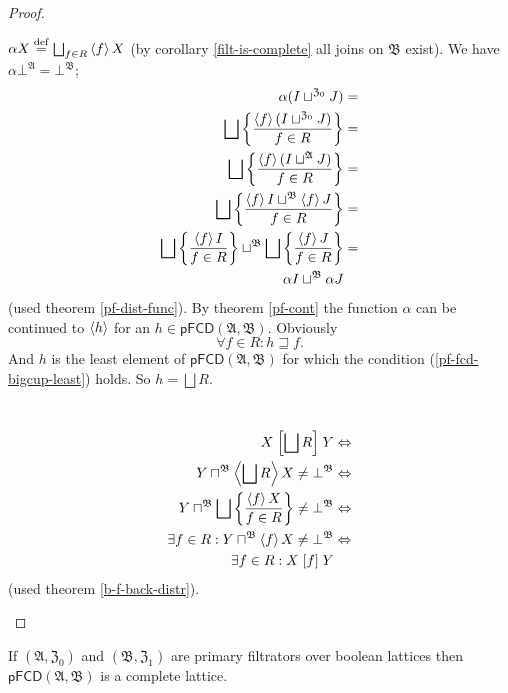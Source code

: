 \begin{proof}
~
\begin{widedisorder}
\item [{\ref{pf-join-f}}] $\alpha X\eqdef\bigsqcup_{f\in R}\supfun fX$
(by corollary \ref{filt-is-complete} all joins on $\mathfrak{B}$
exist). We have $\alpha\bot^{\mathfrak{A}}=\bot^{\mathfrak{B}}$;
\begin{align*}
\alpha(I\sqcup^{\mathfrak{Z}_{0}}J) & =\\
\bigsqcup\setcond{\supfun f(I\sqcup^{\mathfrak{Z}_{0}}J)}{f\in R} & =\\
\bigsqcup\setcond{\supfun f(I\sqcup^{\mathfrak{A}}J)}{f\in R} & =\\
\bigsqcup\setcond{\supfun fI\sqcup^{\mathfrak{B}}\supfun fJ}{f\in R} & =\\
\bigsqcup\setcond{\supfun fI}{f\in R}\sqcup^{\mathfrak{B}}\bigsqcup\setcond{\supfun fJ}{f\in R} & =\\
\alpha I\sqcup^{\mathfrak{B}}\alpha J
\end{align*}
(used theorem \ref{pf-dist-func}). By theorem \ref{pf-cont} the
function $\alpha$ can be continued to $\left\langle h\right\rangle$ for an $h\in\mathsf{pFCD}(\mathfrak{A},\mathfrak{B})$.
Obviously
\begin{equation}
\forall f\in R:h\sqsupseteq f.\label{pf-fcd-bigcup-least}
\end{equation}
And $h$ is the least element of $\mathsf{pFCD}(\mathfrak{A},\mathfrak{B})$
for which the condition (\ref{pf-fcd-bigcup-least}) holds. So $h=\bigsqcup R$.

\begin{widedisorder}
\item [{\ref{pf-join-r}}] ~
\begin{align*}
X\suprel{\bigsqcup R}Y & \Leftrightarrow\\
Y\sqcap^{\mathfrak{B}}\supfun{\bigsqcup R}X\ne\bot^{\mathfrak{B}} & \Leftrightarrow\\
Y\sqcap^{\mathfrak{B}}\bigsqcup\setcond{\supfun fX}{f\in R}\ne\bot^{\mathfrak{B}} & \Leftrightarrow\\
\exists f\in R:Y\sqcap^{\mathfrak{B}}\supfun fX\ne\bot^{\mathfrak{B}} & \Leftrightarrow\\
\exists f\in R:X\suprel fY
\end{align*}
(used theorem \ref{b-f-back-distr}).
\end{widedisorder}
\end{widedisorder}
\end{proof}
\begin{cor}
\label{pf-fcd-compl}If $(\mathfrak{A},\mathfrak{Z}_{0})$ and $(\mathfrak{B},\mathfrak{Z}_{1})$
are primary filtrators over boolean lattices then $\mathsf{pFCD}(\mathfrak{A},\mathfrak{B})$
is a complete lattice.\end{cor}
